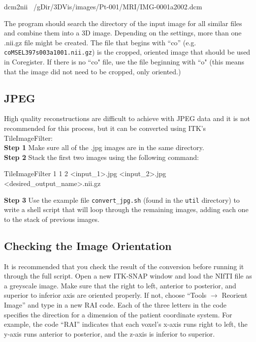 \documentclass[12pt]{article}
\begin{document}
\begin{verb}
  dcm2nii ~/gDir/3DVis/images/Pt-001/MRI/IMG-0001a2002.dcm 
\end{verb}

The program should search the directory of the input image for all similar files and combine them into a 3D image. Depending on the settings, more than one .nii.gz file might be created. The file that begins with ``co'' (e.g. \texttt{coMSEL397s003a1001.nii.gz}) is the cropped, oriented image that should be used in Coregister. If there is no ``co" file, use the file beginning with ``o" (this means that the image did not need to be cropped, only oriented.)

\subsection*{JPEG}
High quality reconstructions are difficult to achieve with JPEG data and it is not recommended for this process, but it can be converted using ITK's TileImageFilter:\\
\textbf{Step 1} Make sure all of the .jpg images are in the same directory. \\
\textbf{Step 2} Stack the first two images using the following command:\\
\begin{verb}
  TileImageFilter 1 1 2 <input_1>.jpg  <input_2>.jpg <desired_output_name>.nii.gz 
\end{verb}
\textbf{Step 3} Use the example file \texttt{convert\_jpg.sh} (found in the \texttt{util} directory) to write a shell script that will loop through the remaining images, adding each one to the stack of previous images. 

\subsection*{Checking the Image Orientation}
It is recommended that you check the result of the conversion before running it through the full script.  Open a new ITK-SNAP window and load the NIfTI file as a greyscale image. Make sure that the right to left, anterior to posterior, and superior to inferior axis are oriented properly. If not, choose ``Tools $\rightarrow$ Reorient Image'' and type in a new RAI code. Each of the three letters in the code specifies the direction for a dimension of the patient coordinate system. For example, the code ``RAI'' indicates that each voxel's x-axis runs right to left, the y-axis runs anterior to posterior, and the z-axis is inferior to superior. 
\end{document}
